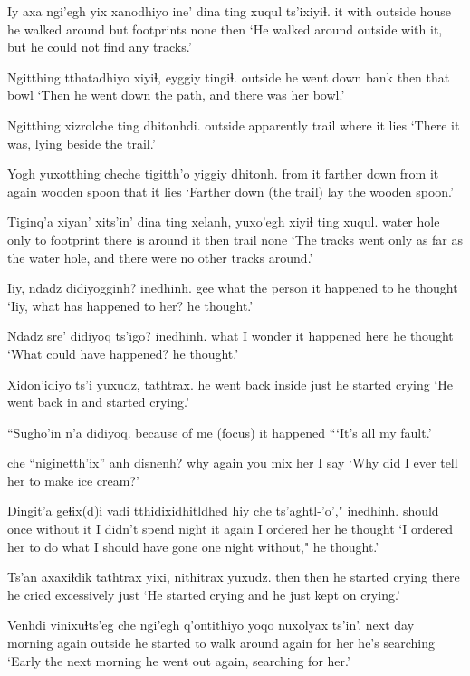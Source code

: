 \documentclass[12pt]{article}
\begin{document}
\gll Iy axa ngi'egh yix {xanodhiyo} ine' {dina ting} xuqul ts'ixiyiɬ.
it with outside house {he walked around} but footprints none then
\glt `He walked around outside with it, but he could not find any tracks.'
\glend

\gll Ngitthing tthatadhiyo xiyiɬ, eyggiy tingiɬ.
outside {he went down bank} then that bowl
\glt `Then he went down the path, and there was her bowl.'
\glend

\gll Ngitthing {xizrolche} ting dhitonhdi.
outside apparently trail {where it lies}
\glt `There it was, lying beside the trail.'
\glend

\gll Yogh yuxotthing cheche tigitth'o yiggiy dhitonh.
{from it} {farther down from it} again {wooden spoon} that {it lies}
\glt `Farther down (the trail) lay the wooden spoon.'
\glend

\gll Tiginq'a xiyan' xits'in' {dina ting} xelanh, yuxo'egh xiyiɬ ting xuqul.
{water hole} only to footprint {there is} {around it} then trail none
\glt `The tracks went only as far as the water hole, and there were no other tracks around.'
\glend

\gll Iiy, ndadz didiyogginh? inedhinh.
gee what {the person it happened to} {he thought}
\glt `Iiy, what has happened to her? he thought.'
\glend

\gll Ndadz sre' didiyoq ts'igo? inedhinh.
what {I wonder} {it happened} {{} here} {he thought}
\glt `What could have happened? he thought.'
\glend

\gll Xidon'idiyo ts'i yuxudz, tathtrax.
{he went back inside} {} just {he started crying}
\glt `He went back in and started crying.'
\glend

\gll ``Sugho'in n'a didiyoq.
{because of me } {(focus)} {it happened}
\glt ```It's all my fault.'
\glend

 che ``niginetth'ix'' anh disnenh?
why again {you mix} her {I say}
\glt `Why did I ever tell her to make ice cream?'
\glend

\gll Dingit'a geɬix(d)i vadi tthidixidhitldhed hiy che ts'aghtl-'o'," inedhinh.
should once {without it} {I didn't spend night} it again {I ordered her} {he thought}
\glt `I ordered her to do what I should have gone one night without," he thought.'
\glend

\gll Ts'an axaxiɬdik tathtrax yixi, nithitrax yuxudz.
then then {he started crying} there {he cried excessively} just
\glt `He started crying and he just kept on crying.'
\glend

\gll Venhdi vinixuɬts'eg che ngi'egh q'ontithiyo yoqo nuxolyax ts'in'.
{next day} morning again outside {he started to walk around again} {for her} {he's searching} {}
\glt `Early the next morning he went out again, searching for her.'
\glend
\end{document}
